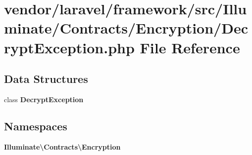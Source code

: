 \section{vendor/laravel/framework/src/\+Illuminate/\+Contracts/\+Encryption/\+Decrypt\+Exception.php File Reference}
\label{_decrypt_exception_8php}
\subsection*{Data Structures}
\begin{DoxyCompactItemize}
\item 
class {\bf Decrypt\+Exception}
\end{DoxyCompactItemize}
\subsection*{Namespaces}
\begin{DoxyCompactItemize}
\item 
 {\bf Illuminate\textbackslash{}\+Contracts\textbackslash{}\+Encryption}
\end{DoxyCompactItemize}

